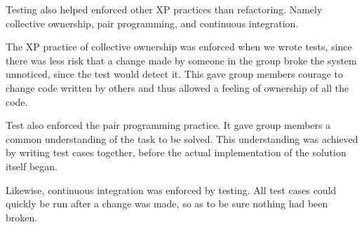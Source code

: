 Testing also helped enforced other XP practices than refactoring. Namely collective ownership, pair programming, and continuous integration. 

The XP practice of collective ownership was enforced when we wrote tests, since there was less risk that a change made by someone in the group broke the system unnoticed, since the test would detect it. This gave group members courage to change code written by others and thus allowed a feeling of ownership of all the code. 

Test also enforced the pair programming practice. It gave group members a common understanding of the task to be solved. This understanding was achieved by writing test cases together, before the actual implementation of the solution itself began.

Likewise, continuous integration was enforced by testing. All test cases could quickly be run after a change was made, so as to be sure nothing had been broken.

